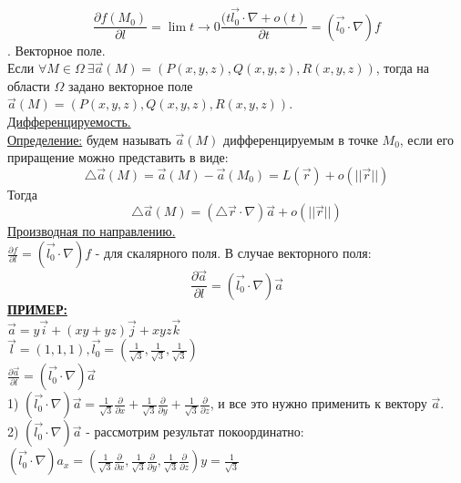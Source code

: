 \documentclass[12pt]{article}
\begin{document}
$$\frac{\partial f (M_0)}{\partial l} = \lim{t\to 0} \frac{(t \overrightarrow{l_0} \cdot \nabla + o(t)}{\partial t} = (\overrightarrow{l_0} \cdot \nabla)f$$
. Векторное поле.\\
Если $\forall M \in \Omega \ \exists \overrightarrow{a}(M) = (P(x,y,z),Q(x,y,z),R(x,y,z))$, тогда на области $\Omega$ задано векторное поле $\overrightarrow{a}(M) = (P(x,y,z),Q(x,y,z),R(x,y,z))$.\\
\uline{Дифференцируемость.}\\
\uline{Определение:} будем называть $\overrightarrow{a}(M)$ дифференцируемым в точке $M_0$, если его приращение можно представить в виде:\\
$${\bigtriangleup \overrightarrow{a}(M)} = \overrightarrow{a}(M) - \overrightarrow{a}(M_0) = L(\overrightarrow{r})+o(||\overrightarrow{r}||)$$
Тогда\\
$${\bigtriangleup \overrightarrow{a}(M)} = ({\bigtriangleup \overrightarrow{r}} \cdot \nabla)\overrightarrow{a} + o(||\overrightarrow{r}||)$$
\uline{Производная по направлению.}\\
$\frac{\partial f}{\partial l} = (\overrightarrow{l_0} \cdot \nabla)f$ - для скалярного поля. В случае векторного поля:\\
$$\frac{\partial \overrightarrow{a}}{\partial l} = (\overrightarrow{l_0} \cdot \nabla)\overrightarrow{a}$$
\uline{\textbf{ПРИМЕР:}}\\
$\overrightarrow{a} = y \overrightarrow{i} + (xy + yz)\overrightarrow{j} + xyz \overrightarrow{k}$\\
$\overrightarrow{l} = (1,1,1), \overrightarrow{l_0} = (\frac{1}{\sqrt{3}},\frac{1}{\sqrt{3}},\frac{1}{\sqrt{3}})$\\
$\frac{\partial \overrightarrow{a}}{\partial l} = (\overrightarrow{l_0} \cdot \nabla)\overrightarrow{a}$\\
1) $(\overrightarrow{l_0} \cdot \nabla)\overrightarrow{a} = \frac{1}{\sqrt{3}} \frac{\partial}{\partial x} + \frac{1}{\sqrt{3}} \frac{\partial}{\partial y} + \frac{1}{\sqrt{3}} \frac{\partial}{\partial z}$, и все это нужно применить к вектору $\overrightarrow{a}$.\\
2) $(\overrightarrow{l_0} \cdot \nabla)\overrightarrow{a}$ - рассмотрим результат покоординатно:\\
$(\overrightarrow{l_0} \cdot \nabla)a_x = (\frac{1}{\sqrt{3}} \frac{\partial}{\partial x},\frac{1}{\sqrt{3}} \frac{\partial}{\partial y},\frac{1}{\sqrt{3}} \frac{\partial}{\partial z})y = \frac{1}{\sqrt{3}}$\\
\end{document}
